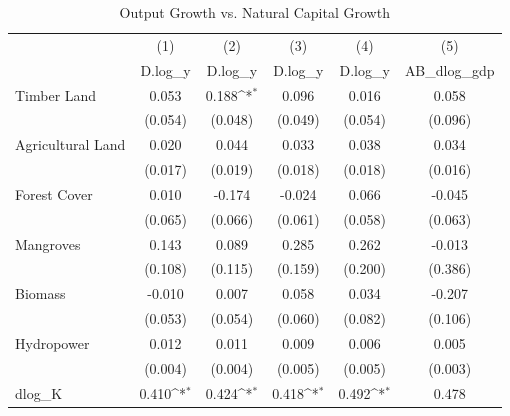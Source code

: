 \begin{table}[htbp]\centering
\def\sym#1{\ifmmode^{#1}\else\(^{#1}\)\fi}
\caption{Output Growth vs. Natural Capital Growth}
\begin{tabular}{l*{5}{c}}
\hline\hline
            &\multicolumn{1}{c}{(1)}&\multicolumn{1}{c}{(2)}&\multicolumn{1}{c}{(3)}&\multicolumn{1}{c}{(4)}&\multicolumn{1}{c}{(5)}\\
            &\multicolumn{1}{c}{D.log\_y}&\multicolumn{1}{c}{D.log\_y}&\multicolumn{1}{c}{D.log\_y}&\multicolumn{1}{c}{D.log\_y}&\multicolumn{1}{c}{AB\_dlog\_gdp}\\
\hline
Timber Land &       0.053       &       0.188\sym{*}&       0.096       &       0.016       &       0.058       \\
            &     (0.054)       &     (0.048)       &     (0.049)       &     (0.054)       &     (0.096)       \\
[1em]
Agricultural Land &       0.020       &       0.044       &       0.033       &       0.038       &       0.034       \\
            &     (0.017)       &     (0.019)       &     (0.018)       &     (0.018)       &     (0.016)       \\
[1em]
Forest Cover &       0.010       &      -0.174       &      -0.024       &       0.066       &      -0.045       \\
            &     (0.065)       &     (0.066)       &     (0.061)       &     (0.058)       &     (0.063)       \\
[1em]
Mangroves &       0.143       &       0.089       &       0.285       &       0.262       &      -0.013       \\
            &     (0.108)       &     (0.115)       &     (0.159)       &     (0.200)       &     (0.386)       \\
[1em]
Biomass &      -0.010       &       0.007       &       0.058       &       0.034       &      -0.207       \\
            &     (0.053)       &     (0.054)       &     (0.060)       &     (0.082)       &     (0.106)       \\
[1em]
Hydropower &       0.012       &       0.011       &       0.009       &       0.006       &       0.005       \\
            &     (0.004)       &     (0.004)       &     (0.005)       &     (0.005)       &     (0.003)       \\
[1em]
dlog\_K      &       0.410\sym{*}&       0.424\sym{*}&       0.418\sym{*}&       0.492\sym{*}&       0.478       \\

\end{tabular}
\end{table}

